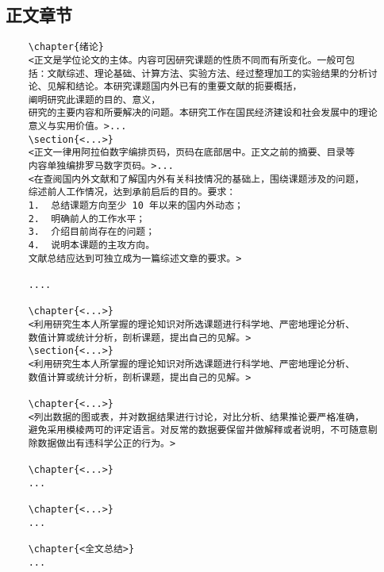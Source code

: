 \documentclass[figurelist,tablelist,algorithmlist,nomlist,masters]{seuthesix}
\begin{document}
\subsection{正文章节}
{\color{magenta}
	\begin{verbatim}
	\chapter{绪论}
	<正文是学位论文的主体。内容可因研究课题的性质不同而有所变化。一般可包
	括：文献综述、理论基础、计算方法、实验方法、经过整理加工的实验结果的分析讨
	论、见解和结论。本研究课题国内外已有的重要文献的扼要概括，
	阐明研究此课题的目的、意义，
	研究的主要内容和所要解决的问题。本研究工作在国民经济建设和社会发展中的理论
	意义与实用价值。>...
	\section{<...>}
	<正文一律用阿拉伯数字编排页码，页码在底部居中。正文之前的摘要、目录等
	内容单独编排罗马数字页码。>...
	<在查阅国内外文献和了解国内外有关科技情况的基础上，围绕课题涉及的问题，
	综述前人工作情况，达到承前启后的目的。要求：
	1.  总结课题方向至少 10 年以来的国内外动态；
	2.  明确前人的工作水平；
	3.  介绍目前尚存在的问题；
	4.  说明本课题的主攻方向。
	文献总结应达到可独立成为一篇综述文章的要求。>
	
	....
	
	\chapter{<...>}
	<利用研究生本人所掌握的理论知识对所选课题进行科学地、严密地理论分析、
	数值计算或统计分析，剖析课题，提出自己的见解。>
	\section{<...>}
	<利用研究生本人所掌握的理论知识对所选课题进行科学地、严密地理论分析、
	数值计算或统计分析，剖析课题，提出自己的见解。>
	
	\chapter{<...>}
	<列出数据的图或表，并对数据结果进行讨论，对比分析、结果推论要严格准确，
	避免采用模棱两可的评定语言。对反常的数据要保留并做解释或者说明，不可随意剔
	除数据做出有违科学公正的行为。>
	
	\chapter{<...>}
	...
	
	\chapter{<...>}
	...
	
	\chapter{<全文总结>}
	...
	
	\end{verbatim}
}
\end{document}
